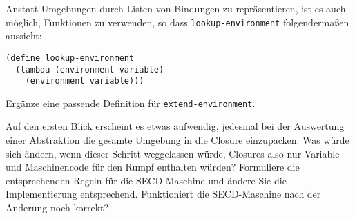 \begin{aufgabe}
  Anstatt Umgebungen durch Listen von Bindungen zu repräsentieren, ist
  es auch möglich, Funktionen zu verwenden, so dass
  \lstinline{lookup-environment} folgendermaßen aussieht:
\begin{lstlisting}
(define lookup-environment
  (lambda (environment variable)
    (environment variable)))
\end{lstlisting}
  Ergänze eine passende Definition für
  \lstinline{extend-environment}.
\end{aufgabe}

\begin{aufgabe}
  Auf den ersten Blick erscheint es etwas aufwendig, jedesmal bei der
  Auswertung einer Abstraktion die gesamte Umgebung in die Closure
  einzupacken.  Was würde sich ändern, wenn dieser Schritt weggelassen
  würde, Closures also nur Variable und Maschinencode für den Rumpf
  enthalten würden?  Formuliere die entsprechenden Regeln für die
  SECD-Maschine und ändere Sie die Implementierung entsprechend.
  Funktioniert die SECD-Maschine nach der Änderung noch korrekt?
\end{aufgabe}


